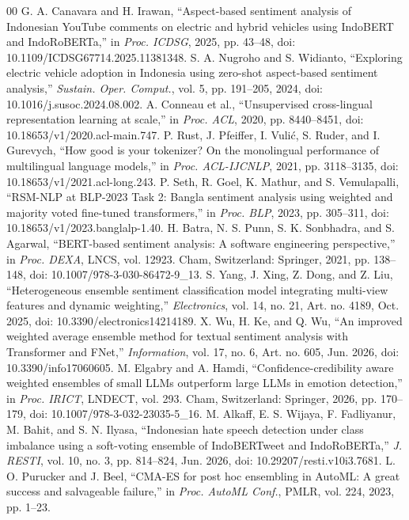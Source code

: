 \begin{thebibliography}{00}
 G. A. Canavara and H. Irawan, ``Aspect-based sentiment analysis of Indonesian YouTube comments on electric and hybrid vehicles using IndoBERT and IndoRoBERTa,'' in \emph{Proc. ICDSG}, 2025, pp. 43--48, doi: 10.1109/ICDSG67714.2025.11381348.
 S. A. Nugroho and S. Widianto, ``Exploring electric vehicle adoption in Indonesia using zero-shot aspect-based sentiment analysis,'' \emph{Sustain. Oper. Comput.}, vol. 5, pp. 191--205, 2024, doi: 10.1016/j.susoc.2024.08.002.
 A. Conneau et al., ``Unsupervised cross-lingual representation learning at scale,'' in \emph{Proc. ACL}, 2020, pp. 8440--8451, doi: 10.18653/v1/2020.acl-main.747.
 P. Rust, J. Pfeiffer, I. Vuli\'{c}, S. Ruder, and I. Gurevych, ``How good is your tokenizer? On the monolingual performance of multilingual language models,'' in \emph{Proc. ACL-IJCNLP}, 2021, pp. 3118--3135, doi: 10.18653/v1/2021.acl-long.243.
 P. Seth, R. Goel, K. Mathur, and S. Vemulapalli, ``RSM-NLP at BLP-2023 Task 2: Bangla sentiment analysis using weighted and majority voted fine-tuned transformers,'' in \emph{Proc. BLP}, 2023, pp. 305--311, doi: 10.18653/v1/2023.banglalp-1.40.
 H. Batra, N. S. Punn, S. K. Sonbhadra, and S. Agarwal, ``BERT-based sentiment analysis: A software engineering perspective,'' in \emph{Proc. DEXA}, LNCS, vol. 12923. Cham, Switzerland: Springer, 2021, pp. 138--148, doi: 10.1007/978-3-030-86472-9\_13.
 S. Yang, J. Xing, Z. Dong, and Z. Liu, ``Heterogeneous ensemble sentiment classification model integrating multi-view features and dynamic weighting,'' \emph{Electronics}, vol. 14, no. 21, Art. no. 4189, Oct. 2025, doi: 10.3390/electronics14214189.
 X. Wu, H. Ke, and Q. Wu, ``An improved weighted average ensemble method for textual sentiment analysis with Transformer and FNet,'' \emph{Information}, vol. 17, no. 6, Art. no. 605, Jun. 2026, doi: 10.3390/info17060605.
 M. Elgabry and A. Hamdi, ``Confidence-credibility aware weighted ensembles of small LLMs outperform large LLMs in emotion detection,'' in \emph{Proc. IRICT}, LNDECT, vol. 293. Cham, Switzerland: Springer, 2026, pp. 170--179, doi: 10.1007/978-3-032-23035-5\_16.
 M. Alkaff, E. S. Wijaya, F. Fadliyanur, M. Bahit, and S. N. Ilyasa, ``Indonesian hate speech detection under class imbalance using a soft-voting ensemble of IndoBERTweet and IndoRoBERTa,'' \emph{J. RESTI}, vol. 10, no. 3, pp. 814--824, Jun. 2026, doi: 10.29207/resti.v10i3.7681.
 L. O. Purucker and J. Beel, ``CMA-ES for post hoc ensembling in AutoML: A great success and salvageable failure,'' in \emph{Proc. AutoML Conf.}, PMLR, vol. 224, 2023, pp. 1--23.

\end{thebibliography}
